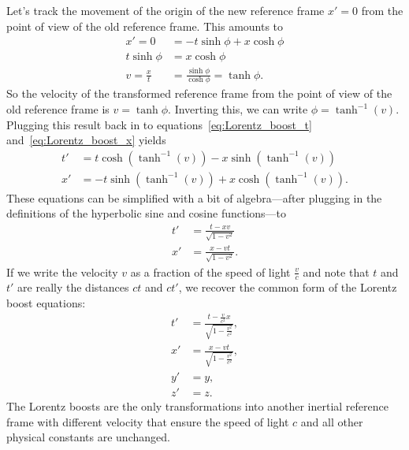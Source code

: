 \documentclass[titlepage,letterpaper,onecolumn,11pt,final]{report}
\numberwithin{equation}{section}
\numberwithin{figure}{section}
\begin{document}
Let's track the movement of the origin of the new reference frame $x' = 0$ from the point of view of the old reference frame. This amounts to
\begin{equation}
\begin{split}
	x' = 0  &= -t \sinh \phi + x \cosh \phi \\
	t \sinh \phi &= x \cosh \phi \\
	v = \frac{x}{t} &= \frac{\sinh \phi}{\cosh \phi } = \tanh \phi .
\end{split}
\end{equation}
%
So the velocity of the transformed reference frame from the point of view of the old reference frame is $v = \tanh \phi$. Inverting this, we can write $\phi = \tanh^{-1} \left( v \right)$. Plugging this result back in to equations~\ref{eq:Lorentz_boost_t} and~\ref{eq:Lorentz_boost_x} yields
\begin{subequations}
\begin{align}
	t' &= t \cosh \left( \tanh^{-1} \left( v \right) \right) - x \sinh \left( \tanh^{-1} \left( v \right) \right) \\
	x' &= -t \sinh \left( \tanh^{-1} \left( v \right) \right) + x \cosh \left( \tanh^{-1} \left( v \right) \right) .
\end{align}
\end{subequations}
%
These equations can be simplified with a bit of algebra---after plugging in the definitions of the hyperbolic sine and cosine functions---to 
\begin{subequations}
\begin{align}
	t' &= \frac{t - x v}{\sqrt{1 - v^{2}}} \\
	x' &= \frac{x - v t}{\sqrt{1 - v^{2}}} .
\end{align}
\end{subequations}
%
If we write the velocity $v$ as a fraction of the speed of light $\frac{v}{c}$ and note that $t$ and $t'$ are really the distances $c t$ and $c t'$, we recover the common form of the Lorentz boost equations:
\begin{subequations}
\begin{align}
	t' &= \frac{t - \frac{v}{c^{2}}x}{\sqrt{1 - \frac{v^{2}}{c^{2}}}} ,\\
	x' &= \frac{x - vt}{\sqrt{1 - \frac{v^{2}}{c^{2}}}} ,\\
	y' &= y ,\\
	z' &= z .
\end{align}
\end{subequations}
%
The Lorentz boosts are the only transformations into another inertial reference frame with different velocity that ensure the speed of light $c$ and all other physical constants are unchanged.
\end{document}
